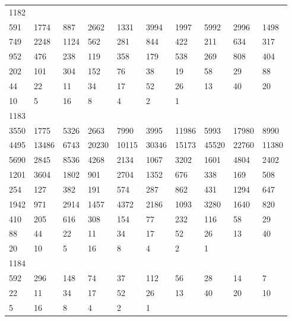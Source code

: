 \begin{longtable}{*{10}{l}}
1182&&&&&&&&&\\
591& 1774& 887& 2662& 1331& 3994& 1997& 5992& 2996& 1498\\
749& 2248& 1124& 562& 281& 844& 422& 211& 634& 317\\
952& 476& 238& 119& 358& 179& 538& 269& 808& 404\\
202& 101& 304& 152& 76& 38& 19& 58& 29& 88\\
44& 22& 11& 34& 17& 52& 26& 13& 40& 20\\
10& 5& 16& 8& 4& 2& 1& \\

1183&&&&&&&&&\\
3550& 1775& 5326& 2663& 7990& 3995& 11986& 5993& 17980& 8990\\
4495& 13486& 6743& 20230& 10115& 30346& 15173& 45520& 22760& 11380\\
5690& 2845& 8536& 4268& 2134& 1067& 3202& 1601& 4804& 2402\\
1201& 3604& 1802& 901& 2704& 1352& 676& 338& 169& 508\\
254& 127& 382& 191& 574& 287& 862& 431& 1294& 647\\
1942& 971& 2914& 1457& 4372& 2186& 1093& 3280& 1640& 820\\
410& 205& 616& 308& 154& 77& 232& 116& 58& 29\\
88& 44& 22& 11& 34& 17& 52& 26& 13& 40\\
20& 10& 5& 16& 8& 4& 2& 1& \\

1184&&&&&&&&&\\
592& 296& 148& 74& 37& 112& 56& 28& 14& 7\\
22& 11& 34& 17& 52& 26& 13& 40& 20& 10\\
5& 16& 8& 4& 2& 1& \\


\end{longtable}
